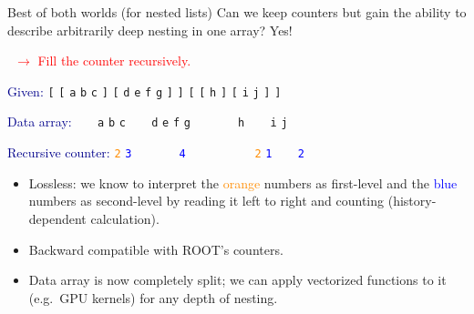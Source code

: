 \documentclass{beamer}
\begin{document}
\begin{frame}{Best of both worlds (for nested lists)}
\vspace{0.5 cm}
Can we keep counters but gain the ability to describe arbitrarily deep nesting in one array? Yes!

\vspace{0.2 cm}
\textcolor{red}{\mbox{\hspace{1 cm} $\rightarrow$} Fill the counter recursively.}

\vspace{0.3 cm}
\textcolor{darkblue}{Given:} \hfill {\tt [} {\tt [} {\tt a} {\tt b} {\tt c} {\tt ]} {\tt [} {\tt d} {\tt e} {\tt f} {\tt g} {\tt ]} {\tt ]} {\tt [} {\tt [} {\tt h} {\tt ]} {\tt [} {\tt i} {\tt j} {\tt ]} {\tt ]}

\textcolor{darkblue}{Data array:} \hfill {\tt \ } {\tt \ } {\tt a} {\tt b} {\tt c} {\tt \ } {\tt \ } {\tt d} {\tt e} {\tt f} {\tt g} {\tt \ } {\tt \ } {\tt \ } {\tt \ } {\tt h} {\tt \ } {\tt \ } {\tt i} {\tt j} {\tt \ } {\tt \ }

\textcolor{darkblue}{Recursive counter:} \hfill \textcolor{darkorange}{\tt 2} \textcolor{blue}{\tt 3} {\tt \ } {\tt \ } {\tt \ } {\tt \ } \textcolor{blue}{\tt 4} {\tt \ } {\tt \ } {\tt \ } {\tt \ } {\tt \ } {\tt \ } \textcolor{darkorange}{\tt 2} \textcolor{blue}{\tt 1} {\tt \ } {\tt \ } \textcolor{blue}{\tt 2} {\tt \ } {\tt \ } {\tt \ } {\tt \ }

\vspace{0.3 cm}
\begin{itemize}
\item Lossless: we know to interpret the \textcolor{darkorange}{orange} numbers as first-level and the \textcolor{blue}{blue} numbers as second-level by reading it left to right and counting (history-dependent calculation).

\item Backward compatible with ROOT's counters.

\item Data array is now completely split; we can apply vectorized functions to it (e.g.\ GPU kernels) for any depth of nesting.
\end{itemize}
\end{frame}
\end{document}
